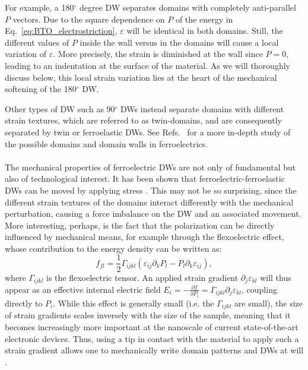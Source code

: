 For example, a 180$^\circ$ degree DW separates domains with completely anti-parallel $P$ vectors.
Due to the square dependence on $P$ of the energy in Eq.~\eqref{eq:BTO_electrostriction}, $\varepsilon$ will be identical in both domains. Still, the different values of $P$ inside the wall versus in the domains will cause a local variation of $\varepsilon$. More precisely, the strain is diminished at the wall since $P=0$, leading to an indentation at the surface of the material.
As we will thoroughly discuss below, this local strain variation lies at the heart of the mechanical softening of the 180$^\circ$ DW.

Other types of DW such as 90$^\circ$ DWs instead separate domains with different strain textures, which are referred to as twin-domains, and are consequently separated by twin or ferroelastic DWs.
See Refs.~\cite{Cao1991,Hu1998,Marton2010} for a more in-depth study of the possible domains and domain walls in ferroelectrics.
\\\\
The mechanical properties of ferroelectric DWs are not only of fundamental but also of technological interest.
It has been shown that ferroelectric-ferroelastic DWs can be moved by applying stress \cite{Schneider2001}.
This may not be so surprising, since the different strain textures of the domains interact differently with the mechanical perturbation, causing a force imbalance on the DW and an associated movement.
More interesting, perhaps, is the fact that the polarization can be directly influenced by mechanical means, for example through the flexoelectric effect, whose contribution to the energy density can be written as:
\begin{equation}
	\label{eq:BTO_flexoelectricity}
	f_{fl} = \frac{1}{2}\Gamma_{ijkl}(\varepsilon_{ij}\partial_kP_l-P_l\partial_k\varepsilon_{ij}),
\end{equation}
where $\Gamma_{ijkl}$ is the flexoelectric tensor.
An applied strain gradient $\partial_j\varepsilon_{kl}$ will thus appear as an effective internal electric field $E_{i} = -\frac{\partial f}{\partial P_i} = \Gamma_{ijkl}\partial_j\varepsilon_{kl}$, coupling directly to $P_i$.
While this effect is generally small (i.e. the $\Gamma_{ijkl}$ are small), the size of strain gradients scales inversely with the size of the sample, meaning that it becomes increasingly more important at the nanoscale of current state-of-the-art electronic devices.
Thus, using a tip in contact with the material to apply such a strain gradient allows one to mechanically write domain patterns and DWs at will \cite{Lu2012,Abdollahi2015, Cordero-Edwards2017,Cordero-Edwards2019}.

